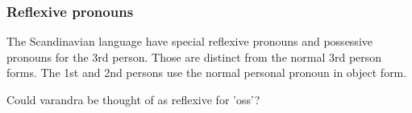 \documentclass{report}
\begin{document}
\subsubsection*{Reflexive pronouns}
\label{swe:refl}
The Scandinavian language have special reflexive pronouns
and possessive pronouns for the 3rd
person\cite[ \& 319]{H&H}. Those are distinct from the normal 3rd person forms.
The 1st and 2nd persons use the normal personal pronoun in object form.


Could varandra be thought of as reflexive for 'oss'?
\end{document}

